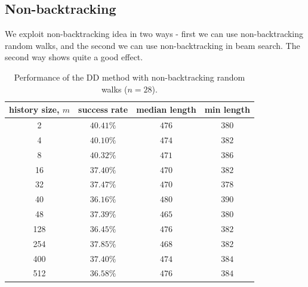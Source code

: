 \documentclass[reqno,11pt]{amsart}
\begin{document}
\subsection{Non-backtracking}
We exploit non-backtracking idea in two ways - first we can use non-backtracking random walks, and the second we can use non-backtracking in beam search. The second way shows quite a good effect. 



\begin{table}[t]
    \centering
    \begin{tabular}{|c|c|c|c|}
        \hline
        history size, $m$ & success rate & median length & min length \\
        \hline\hline
        2   & $40.41\%$ & $476$ & $380$ \\
\hline
4   & $40.10\%$ & $474$ & $382$ \\
\hline
8   & $40.32\%$ & $471$ & $386$ \\
\hline
16  & $37.40\%$ & $470$ & $382$ \\
\hline
32  & $37.47\%$ & $470$ & $378$ \\
\hline
40  & $36.16\%$ & $480$ & $390$ \\
\hline
48  & $37.39\%$ & $465$ & $380$ \\
\hline
128 & $36.45\%$ & $476$ & $382$ \\
\hline
254 & $37.85\%$ & $468$ & $382$ \\
\hline
400 & $37.40\%$ & $474$ & $384$ \\
\hline
512 & $36.58\%$ & $476$ & $384$ \\
\hline    
    \end{tabular}
    \captionsetup{skip=10pt} 
    \caption{Performance of the DD method with non-backtracking random walks ($n=28$). }
    \label{tab:nbt}
\end{table}
\end{document}
